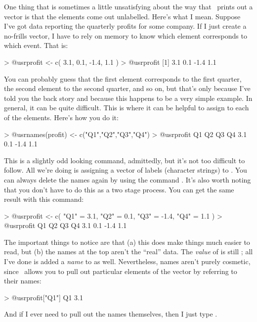 One thing that is sometimes a little unsatisfying about the way that \R\ prints out a vector is that the elements come out unlabelled. Here's what I mean. Suppose I've got data reporting the quarterly profits for some company. If I just create a no-frills vector, I have to rely on memory to know which element corresponds to which event. That is:
\begin{rblock1}
> @usr{profit <- c( 3.1, 0.1, -1.4, 1.1 )}
> @usr{profit}
[1]  3.1  0.1 -1.4  1.1
\end{rblock1}
You can probably guess that the first element corresponds to the first quarter, the second element to the second quarter, and so on, but that's only because I've told you the back story and because this happens to be a very simple example. In general, it can be quite difficult. This is where it can be helpful to assign  to each of the elements. Here's how you do it:
\begin{rblock1}
> @usr{names(profit) <- c("Q1","Q2","Q3","Q4")}
> @usr{profit}
  Q1   Q2   Q3   Q4 
 3.1  0.1 -1.4  1.1 
\end{rblock1}
This is a slightly odd looking command, admittedly, but it's not too difficult to follow. All we're doing is assigning a vector of labels (character strings) to . You can always delete the names again by using the command . It's also worth noting that you don't have to do this as a two stage process. You can get the same result with this command:
\begin{rblock1}
> @usr{profit <- c( "Q1" = 3.1, "Q2" = 0.1, "Q3" = -1.4, "Q4" = 1.1 )}
> @usr{profit}
  Q1   Q2   Q3   Q4 
 3.1  0.1 -1.4  1.1 
 \end{rblock1}
The important things to notice are that (a) this does make things much easier to read, but (b) the names at the top aren't the ``real'' data. The {\it value} of  is still ; all I've done is added a {\it name} to  as well. Nevertheless, names aren't purely cosmetic, since \R\ allows you to pull out particular elements of the vector by referring to their names:
\begin{rblock1}
> @usr{profit["Q1"]}
 Q1 
3.1  
\end{rblock1}
And if I ever need to pull out the names themselves, then I just type . 


